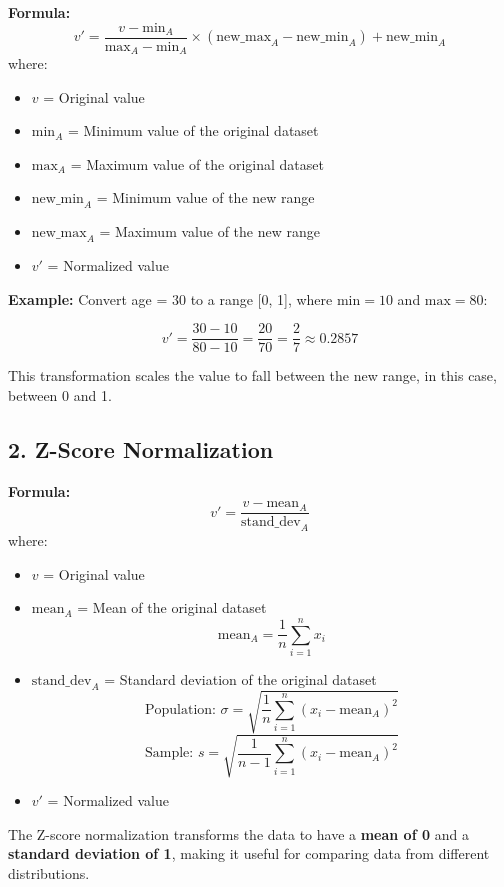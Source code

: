 \documentclass[a4paper,10pt]{article}
\begin{document}
\textbf{Formula:}
\[
v' = \frac{v - \text{min}_A}{\text{max}_A - \text{min}_A} \times (\text{new\_max}_A - \text{new\_min}_A) + \text{new\_min}_A
\]
where:
\begin{itemize}
    \item \( v \) = Original value  
    \item \( \text{min}_A \) = Minimum value of the original dataset  
    \item \( \text{max}_A \) = Maximum value of the original dataset  
    \item \( \text{new\_min}_A \) = Minimum value of the new range  
    \item \( \text{new\_max}_A \) = Maximum value of the new range  
    \item \( v' \) = Normalized value
\end{itemize}

\textbf{Example:}  
Convert age = 30 to a range [0, 1], where \( \text{min} = 10 \) and \( \text{max} = 80 \):

\[
v' = \frac{30 - 10}{80 - 10} = \frac{20}{70} = \frac{2}{7} \approx 0.2857
\]

This transformation scales the value to fall between the new range, in this case, between 0 and 1.

\vspace{0.5cm}

\subsection*{2. Z-Score Normalization}

\textbf{Formula:}
\[
v' = \frac{v - \text{mean}_A}{\text{stand\_dev}_A}
\]
where:
\begin{itemize}
    \item \( v \) = Original value  
    \item \( \text{mean}_A \) = Mean of the original dataset  
    \[
    \text{mean}_A = \frac{1}{n}\sum_{i=1}^{n} x_i
    \]
    \item \( \text{stand\_dev}_A \) = Standard deviation of the original dataset  
    \[
    \text{Population: } \sigma = \sqrt{\frac{1}{n}\sum_{i=1}^{n} (x_i - \text{mean}_A)^2}
    \]
    \[
    \text{Sample: } s = \sqrt{\frac{1}{n-1}\sum_{i=1}^{n} (x_i - \text{mean}_A)^2}
    \]
    \item \( v' \) = Normalized value
\end{itemize}

The Z-score normalization transforms the data to have a \textbf{mean of 0} and a \textbf{standard deviation of 1}, making it useful for comparing data from different distributions.
\end{document}
